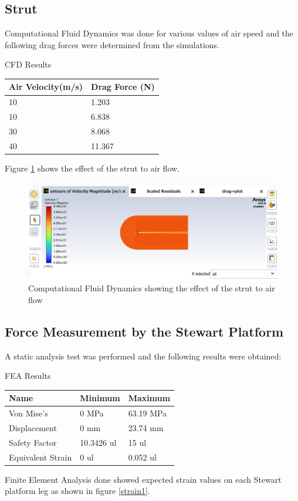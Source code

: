 \subsection{Strut}
Computational Fluid Dynamics was done for various values of air speed and the following drag forces were
determined from the simulations.
\begin{table}[H]
	\caption{CFD Results}
	\end{table}
	\begin{center}
	\begin{tabular}{|l|l|}
	\hline
	\textbf{Air Velocity(m/s)} & \textbf{Drag Force (N)}\\
	\hline
	10 & 1.203 \\
	\hline
	10 & 6.838 \\
	\hline
	30 & 8.068 \\
	\hline
	40 & 11.367 \\
	\hline
	\end{tabular}
\end{center}
Figure \ref{cfd} shows the effect of the strut to air flow.
\begin{center}
	\begin{figure}[H]
		\centering
		\includegraphics[width=0.8\linewidth]{Figures/CFD.png}
		\caption[CFD]{Computational Fluid Dynamics showing the effect of the strut to air flow}
		\label{cfd}
	\end{figure}
\end{center}

\subsection{Force Measurement by the Stewart Platform}
A static analysis test was performed and the following results were obtained:
\begin{table}[H]
	\caption{FEA Results}
\end{table}
\begin{center}
	\begin{tabular}{|l|l|l|}
		\hline
		\textbf{Name}     & \textbf{Minimum} & \textbf{Maximum} \\
		\hline
		Von Mise's        & 0 MPa            & 63.19 MPa        \\
		\hline
		Displacement      & 0 mm             & 23.74 mm         \\
		\hline
		Safety Factor     & 10.3426 ul       & 15 ul            \\
		\hline
		Equivalent Strain & 0 ul             & 0.052 ul         \\
		\hline
	\end{tabular}
\end{center}
Finite Element Analysis done showed expected strain values on each
Stewart platform leg as shown in figure \ref{strain1}.

